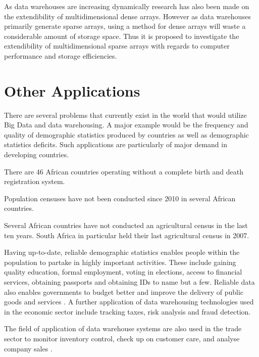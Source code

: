 As data warehouses are increasing dynamically research has also been made on the extendibility of multidimensional dense arrays. However as data warehouses primarily generate sparse arrays, using a method for dense arrays will waste a considerable amount of storage space. Thus it is proposed to investigate the extendibility of multidimensional sparse arrays with regards to computer performance and storage efficiencies.

\section{Other Applications}
There are several problems that currently exist in the world that would utilize Big Data and data warehousing. A major example would be the frequency and quality of demographic statistics produced by countries as well as demographic statistics deficits. Such applications are particularly of major demand in developing countries.

\begin{compactitem}
	\item There are 46 African countries operating without a complete birth and death registration system.
	\item Population censuses have not been conducted since 2010 in several African countries.
	\item Several African countries have not conducted an agricultural census in the last ten years. South Africa in particular held their last agricultural census in 2007.
\end{compactitem}

Having up-to-date, reliable demographic statistics enables people within the population to partake in highly important activities. These include gaining quality education, formal employment, voting in elections, access to financial services, obtaining passports and obtaining IDs to name but a few. Reliable data also enables governments to budget better and improve the delivery of public goods and services \cite{mo:2015:sin}. A further application of data warehousing technologies used in the economic sector include tracking taxes, risk analysis and fraud detection. 

The field of application of data warehouse systems are also used in the trade sector to monitor inventory control, check up on customer care, and analyse company sales \cite{golfarelli:2009:dwd}.



